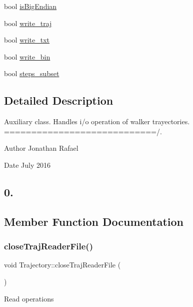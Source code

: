 \begin{DoxyCompactItemize}
\item 
bool \hyperlink{class_trajectory_a66dfa9e8d1e60706b8e8bb1e91a34e29}{is\+Big\+Endian}
\item 
bool \hyperlink{class_trajectory_a1194477068ed051401f99aba4a1056b1}{write\+\_\+traj}
\item 
bool \hyperlink{class_trajectory_a94125474ee64fd3007091a3e88f59769}{write\+\_\+txt}
\item 
bool \hyperlink{class_trajectory_a7135e87575f429a7d6ad32477dc96e2c}{write\+\_\+bin}
\item 
bool \hyperlink{class_trajectory_a973422e0d41afe4720fbbf62500a5035}{steps\+\_\+subset}
\end{DoxyCompactItemize}


\subsection{Detailed Description}
Auxiliary class. Handles i/o operation of walker trayectories. ============================/. 

\begin{DoxyAuthor}{Author}
Jonathan Rafael 
\end{DoxyAuthor}
\begin{DoxyDate}{Date}
July 2016 \subsection*{0. }
\end{DoxyDate}


\subsection{Member Function Documentation}
\mbox{\label{class_trajectory_a9aedf2530dca72ca629741585717c64a}} 
\subsubsection{\texorpdfstring{close\+Traj\+Reader\+File()}{closeTrajReaderFile()}}
{\footnotesize\ttfamily void Trajectory\+::close\+Traj\+Reader\+File (\begin{DoxyParamCaption}{ }\end{DoxyParamCaption})}

Read operations \mbox{\label{class_trajectory_aec9f75fa04452af2199888c47652c7e4}} 
